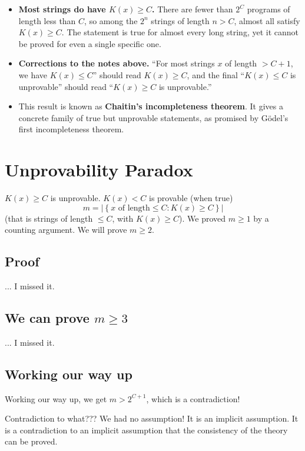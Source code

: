 \documentclass{article}
\begin{document}
\begin{itemize}
    \item \textbf{Most strings do have $K(x)\geq C$.} There are fewer than $2^C$ programs of length less than $C$, so among the $2^n$ strings of length $n > C$, almost all satisfy $K(x)\geq C$. The statement is true for almost every long string, yet it cannot be proved for even a single specific one.
    \item \textbf{Corrections to the notes above.} ``For most strings $x$ of length $>C+1$, we have $K(x)\leq C$'' should read $K(x)\geq C$, and the final ``$K(x)\leq C$ is unprovable'' should read ``$K(x)\geq C$ is unprovable.''
    \item This result is known as \textbf{Chaitin's incompleteness theorem}. It gives a concrete family of true but unprovable statements, as promised by G\"odel's first incompleteness theorem.
\end{itemize}

\section{Unprovability Paradox}

$K(x) \geq C$ is unprovable. $K(x) < C$ is provable (when true)
\[
m = \lvert \left\{ x \text{ of length} \leq C : K(x) \geq C \right\} \rvert
\]
(that is strings of length $\leq C$, with $K(x)\geq C$). We proved $m\geq 1$ by a counting argument. We will prove $m\geq 2$.

\subsection{Proof}

... I missed it.

\subsection{We can prove $m\geq 3$}

... I missed it.

\subsection{Working our way up}

Working our way up, we get $m> 2^{C+1}$, which is a contradiction!

Contradiction to what??? We had no assumption! It is an implicit assumption. It is a contradiction to an implicit assumption that the consistency of the theory can be proved.
\end{document}

